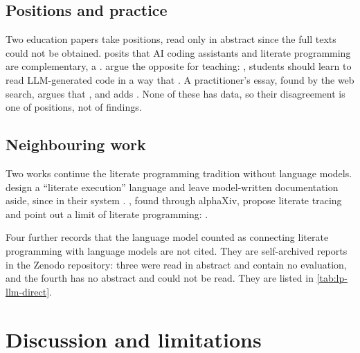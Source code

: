 \subsection{Positions and practice}

Two education papers take positions, read only in abstract since the full texts
could not be obtained.
\Textcite{Birkenkrahe2024} posits that AI coding assistants and literate
programming are complementary, a .
\Textcite{Rosiene2024} argue the opposite for teaching: ,
students should learn to read LLM-generated code in a way that
.
A practitioner's essay, found by the web search, argues that
,
and adds .
None of these has data, so their disagreement is one of positions, not of
findings.

\subsection{Neighbouring work}

Two works continue the literate programming tradition without language models.
\Textcite{Bond2026LitExec} design a \enquote{literate execution} language and
leave model-written documentation aside, since in their system
.
\Textcite{Sotoudeh2025}, found through alphaXiv, propose literate tracing and
point out a limit of literate programming:
.

Four further records that the language model counted as connecting literate
programming with language models are not cited.
They are self-archived reports in the Zenodo repository: three were read in
abstract and contain no evaluation, and the fourth has no abstract and could
not be read.
They are listed in \cref{tab:lp-llm-direct}.

\section{Discussion and limitations}
\label{sec:ai-rq1-discussion}

